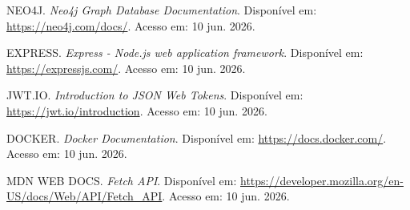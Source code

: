 \documentclass[12pt,a4paper]{article}
\begin{document}
NEO4J. \textit{Neo4j Graph Database Documentation}. Disponível em: \url{https://neo4j.com/docs/}. Acesso em: 10 jun. 2026.

EXPRESS. \textit{Express - Node.js web application framework}. Disponível em: \url{https://expressjs.com/}. Acesso em: 10 jun. 2026.

JWT.IO. \textit{Introduction to JSON Web Tokens}. Disponível em: \url{https://jwt.io/introduction}. Acesso em: 10 jun. 2026.

DOCKER. \textit{Docker Documentation}. Disponível em: \url{https://docs.docker.com/}. Acesso em: 10 jun. 2026.

MDN WEB DOCS. \textit{Fetch API}. Disponível em: \url{https://developer.mozilla.org/en-US/docs/Web/API/Fetch_API}. Acesso em: 10 jun. 2026.
\end{document}
